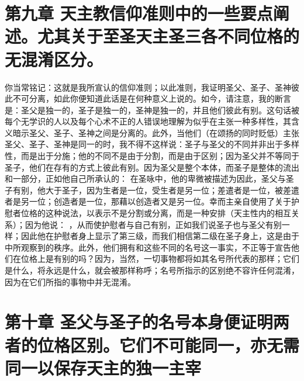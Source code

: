 
\section{第九章 天主教信仰准则中的一些要点阐述。尤其关于至圣天主圣三各不同位格的无混淆区分。}

你当常铭记：这就是我所宣认的信仰准则；以此准则，我证明圣父、圣子、圣神彼此不可分离，如此你便知道此话是在何种意义上说的。如今，请注意，我的断言是：圣父是独一的，圣子是独一的，圣神是独一的，并且他们彼此有别。这句话被每个无学识的人以及每个心术不正的人错误地理解为似乎在主张一种多样性，其含义暗示圣父、圣子、圣神之间是分离的。此外，当他们（在颂扬的同时贬低）主张圣父、圣子、圣神是同一的时，我不得不这样说：圣子与圣父的不同并非出于多样性，而是出于分施；他的不同不是由于分割，而是由于区别；因为圣父并不等同于圣子，他们在存有的方式上彼此有别。因为圣父是整个本体，而圣子是整体的流出和一部分，正如他自己所承认的： 在圣咏中，他的卑微被描述为因此，圣父与圣子有别，他大于圣子，因为生者是一位，受生者是另一位；差遣者是一位，被差遣者是另一位；创造者是一位，那藉以创造者又是另一位。幸而主亲自使用了关于护慰者位格的这种说法，以表示不是分割或分离，而是一种安排（天主性内的相互关系）；因为他说： ，从而使护慰者与自己有别，正如我们说圣子也与圣父有别一样；因此他在护慰者身上显示了第三级，而我们相信第二级在圣子身上，这是由于中所观察到的秩序。此外，他们拥有和这些不同的名号这一事实，不正等于宣告他们在位格上是有别的吗？因为，当然，一切事物都将如其名号所代表的那样；它们是什么，将永远是什么，就会被那样称呼；名号所指示的区别绝不容许任何混淆，因为在它们所指的事物中并无混淆。 \par


\section{第十章 圣父与圣子的名号本身便证明两者的位格区别。它们不可能同一，亦无需同一以保存天主的独一主宰}

